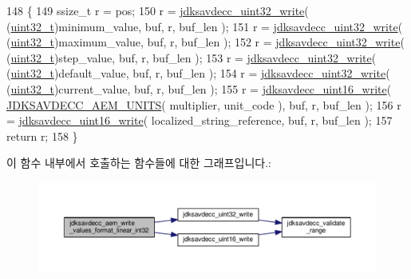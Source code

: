 \begin{DoxyCode}
148 \{
149     ssize\_t r = pos;
150     r = \hyperlink{group__endian_ga5c8d1aadb6e4ea355503a1945cfdbb92}{jdksavdecc\_uint32\_write}( (\hyperlink{parse_8c_a6eb1e68cc391dd753bc8ce896dbb8315}{uint32\_t})minimum\_value, buf, r, buf\_len );
151     r = \hyperlink{group__endian_ga5c8d1aadb6e4ea355503a1945cfdbb92}{jdksavdecc\_uint32\_write}( (\hyperlink{parse_8c_a6eb1e68cc391dd753bc8ce896dbb8315}{uint32\_t})maximum\_value, buf, r, buf\_len );
152     r = \hyperlink{group__endian_ga5c8d1aadb6e4ea355503a1945cfdbb92}{jdksavdecc\_uint32\_write}( (\hyperlink{parse_8c_a6eb1e68cc391dd753bc8ce896dbb8315}{uint32\_t})step\_value, buf, r, buf\_len );
153     r = \hyperlink{group__endian_ga5c8d1aadb6e4ea355503a1945cfdbb92}{jdksavdecc\_uint32\_write}( (\hyperlink{parse_8c_a6eb1e68cc391dd753bc8ce896dbb8315}{uint32\_t})default\_value, buf, r, buf\_len );
154     r = \hyperlink{group__endian_ga5c8d1aadb6e4ea355503a1945cfdbb92}{jdksavdecc\_uint32\_write}( (\hyperlink{parse_8c_a6eb1e68cc391dd753bc8ce896dbb8315}{uint32\_t})current\_value, buf, r, buf\_len );
155     r = \hyperlink{group__endian_ga4c0851ce17bde5306fdb04bfb5b75af1}{jdksavdecc\_uint16\_write}( \hyperlink{group__aem__descriptor_gae5f7498f6048b4dda1aca923b0eae0f6}{JDKSAVDECC\_AEM\_UNITS}( 
      multiplier, unit\_code ), buf, r, buf\_len );
156     r = \hyperlink{group__endian_ga4c0851ce17bde5306fdb04bfb5b75af1}{jdksavdecc\_uint16\_write}( localized\_string\_reference, buf, r, buf\_len );
157     \textcolor{keywordflow}{return} r;
158 \}
\end{DoxyCode}


이 함수 내부에서 호출하는 함수들에 대한 그래프입니다.\+:
\nopagebreak
\begin{figure}[H]
\begin{center}
\leavevmode
\includegraphics[width=350pt]{group__aem__descriptor_ga0634ae54ce837152f4a685852c043b90_cgraph}
\end{center}
\end{figure}


